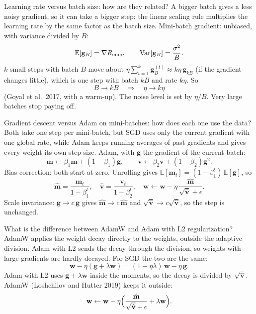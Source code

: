 \begin{qabox}[Schlüter]{\asked Learning rate versus batch size: how are they related?}
\ans A bigger batch gives a less noisy gradient, so it can take a bigger step: the linear scaling rule multiplies
the learning rate by the same factor as the batch size.
\formula Mini-batch gradient: unbiased, with variance divided by $B$:
\[ \mathbb{E}[\mathbf{g}_B]=\nabla R_{\mathrm{emp}},\qquad \mathrm{Var}[\mathbf{g}_B]=\frac{\sigma^2}{B}. \]
$k$ small steps with batch $B$ move about $\eta\sum_{t=1}^{k}\mathbf{g}_B^{(t)}\approx k\eta\,\mathbf{g}_{kB}$ (if the
gradient changes little), which is one step with batch $kB$ and rate $k\eta$. So
\[ B\to kB\quad\Longrightarrow\quad \eta\to k\eta \]
(Goyal et al.\ 2017, with a warm-up). The noise level is set by $\eta/B$. Very large batches stop paying off.
\end{qabox}

\begin{qabox}[Schlüter]{\asked Gradient descent versus Adam on mini-batches: how does each one use the data?}
\ans Both take one step per mini-batch, but SGD uses only the current gradient with one global rate, while Adam
keeps running averages of past gradients and gives every weight its own step size.
\formula Adam, with $\mathbf{g}$ the gradient of the current batch:
\[ \mathbf{m}\leftarrow\beta_1\mathbf{m}+(1-\beta_1)\mathbf{g},\qquad \mathbf{v}\leftarrow\beta_2\mathbf{v}+(1-\beta_2)\mathbf{g}^2 . \]
Bias correction: both start at zero. Unrolling gives $\mathbb{E}[\mathbf{m}_t]=(1-\beta_1^t)\,\mathbb{E}[\mathbf{g}]$, so
\[ \hat{\mathbf{m}}=\frac{\mathbf{m}_t}{1-\beta_1^t},\quad \hat{\mathbf{v}}=\frac{\mathbf{v}_t}{1-\beta_2^t},\quad \mathbf{w}\leftarrow\mathbf{w}-\eta\,\frac{\hat{\mathbf{m}}}{\sqrt{\hat{\mathbf{v}}}+\epsilon}. \]
Scale invariance: $\mathbf{g}\to c\,\mathbf{g}$ gives $\hat{\mathbf{m}}\to c\,\hat{\mathbf{m}}$ and $\sqrt{\hat{\mathbf{v}}}\to c\sqrt{\hat{\mathbf{v}}}$, so the step is unchanged.
\end{qabox}

\begin{qabox}[Hochreiter]{\asked What is the difference between AdamW and Adam with L2 regularization?}
\ans AdamW applies the weight decay directly to the weights, outside the adaptive division. Adam with L2 sends the
decay through the division, so weights with large gradients are hardly decayed.
\formula For SGD the two are the same:
\[ \mathbf{w}-\eta(\mathbf{g}+\lambda\mathbf{w})=(1-\eta\lambda)\,\mathbf{w}-\eta\,\mathbf{g}. \]
Adam with L2 uses $\mathbf{g}+\lambda\mathbf{w}$ inside the moments, so the decay is divided by $\sqrt{\hat{\mathbf{v}}}$. AdamW
(Loshchilov and Hutter 2019) keeps it outside:
\[ \mathbf{w}\leftarrow\mathbf{w}-\eta\Bigl(\frac{\hat{\mathbf{m}}}{\sqrt{\hat{\mathbf{v}}}+\epsilon}+\lambda\mathbf{w}\Bigr). \]
\end{qabox}

